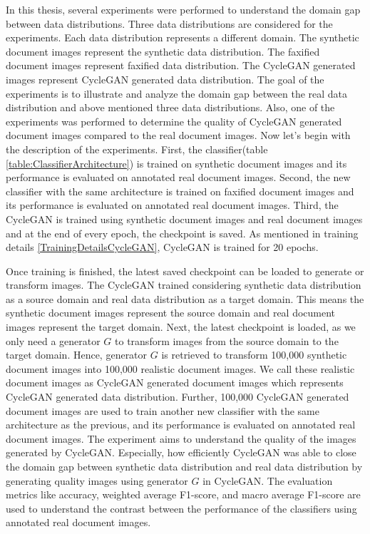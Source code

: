 In this thesis, several experiments were performed to understand the domain gap between data distributions. Three data distributions are considered for the experiments. Each data distribution represents a different domain. The synthetic document images represent the synthetic data distribution. The faxified document images represent faxified data distribution. The \ac{CycleGAN} generated images represent \ac{CycleGAN} generated data distribution. The goal of the experiments is to illustrate and analyze the domain gap between the real data distribution and above mentioned three data distributions. Also, one of the experiments was performed to determine the quality of \ac{CycleGAN} generated document images compared to the real document images. Now let's begin with the description of the experiments. First, the classifier(table \ref{table:ClassifierArchitecture}) is trained on synthetic document images and its performance is evaluated on annotated real document images. Second, the new classifier with the same architecture is trained on faxified document images and its performance is evaluated on annotated real document images. Third, the \ac{CycleGAN} is trained using synthetic document images and real document images and at the end of every epoch, the checkpoint is saved. As mentioned in training details \ref{TrainingDetailsCycleGAN}, \ac{CycleGAN} is trained for 20 epochs. 

Once training is finished, the latest saved checkpoint can be loaded to generate or transform images. The \ac{CycleGAN} trained considering synthetic data distribution as a source domain and real data distribution as a target domain. This means the synthetic document images represent the source domain and real document images represent the target domain. Next, the latest checkpoint is loaded, as we only need a generator $G$ to transform images from the source domain to the target domain. Hence, generator $G$ is retrieved to transform 100,000 synthetic document images into 100,000 realistic document images. We call these realistic document images as \ac{CycleGAN} generated document images which represents \ac{CycleGAN} generated data distribution. Further, 100,000 \ac{CycleGAN} generated document images are used to train another new classifier with the same architecture as the previous, and its performance is evaluated on annotated real document images. The experiment aims to understand the quality of the images generated by \ac{CycleGAN}. Especially, how efficiently \ac{CycleGAN} was able to close the domain gap between synthetic data distribution and real data distribution by generating quality images using generator $G$ in \ac{CycleGAN}. The evaluation metrics like accuracy, weighted average F1-score, and macro average F1-score \cite{lipton2014thresholding} are used to understand the contrast between the performance of the classifiers using annotated real document images.

